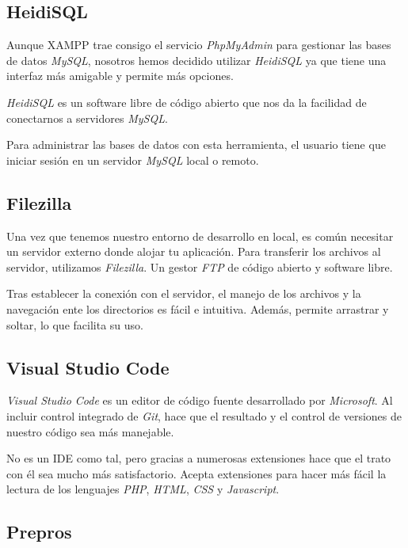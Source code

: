 \subsection{HeidiSQL}

Aunque XAMPP trae consigo el servicio \textit{PhpMyAdmin} para gestionar las bases de datos \textit{MySQL}, nosotros hemos decidido utilizar \textit{HeidiSQL} ya que tiene una interfaz más amigable y permite más opciones.

\textit{HeidiSQL} es un software libre de código abierto que nos da la facilidad de conectarnos a servidores \textit{MySQL}.

Para administrar las bases de datos con esta herramienta, el usuario tiene que iniciar sesión en un servidor \textit{MySQL} local o remoto. 

\subsection{Filezilla}

Una vez que tenemos nuestro entorno de desarrollo en local, es común necesitar un servidor externo donde alojar tu aplicación. Para transferir los archivos al servidor, utilizamos \textit{Filezilla}. Un gestor \textit{FTP} de código abierto y software libre.

Tras establecer la conexión con el servidor, el manejo de los archivos y la navegación ente los directorios es fácil e intuitiva. Además, permite arrastrar y soltar, lo que facilita su uso.

\subsection{Visual Studio Code}

\textit{Visual Studio Code} es un editor de código fuente desarrollado por \textit{Microsoft}. Al incluir control integrado de \textit{Git}, hace que el resultado y el control de versiones de nuestro código sea más manejable.

No es un IDE como tal, pero gracias a numerosas extensiones hace que el trato con él sea mucho más satisfactorio. Acepta extensiones para hacer más fácil la lectura de los lenguajes \textit{PHP}, \textit{HTML}, \textit{CSS} y \textit{Javascript}. 



\subsection{Prepros}

